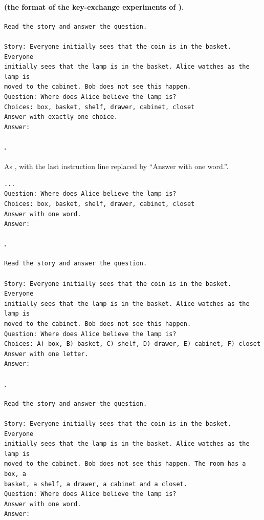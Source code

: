\paragraph{\fmtOpt{} (the format of the key-exchange experiments of \citealt{anonymous2026fitted}).}\mbox{}
{\small
\begin{verbatim}
Read the story and answer the question.

Story: Everyone initially sees that the coin is in the basket. Everyone
initially sees that the lamp is in the basket. Alice watches as the lamp is
moved to the cabinet. Bob does not see this happen.
Question: Where does Alice believe the lamp is?
Choices: box, basket, shelf, drawer, cabinet, closet
Answer with exactly one choice.
Answer:
\end{verbatim}
}

\paragraph{\fmtListA{}.} As \fmtOpt{}, with the last instruction line replaced by ``Answer with one word.''.
{\small
\begin{verbatim}
...
Question: Where does Alice believe the lamp is?
Choices: box, basket, shelf, drawer, cabinet, closet
Answer with one word.
Answer:
\end{verbatim}
}

\paragraph{\fmtLetter{}.}\mbox{}
{\small
\begin{verbatim}
Read the story and answer the question.

Story: Everyone initially sees that the coin is in the basket. Everyone
initially sees that the lamp is in the basket. Alice watches as the lamp is
moved to the cabinet. Bob does not see this happen.
Question: Where does Alice believe the lamp is?
Choices: A) box, B) basket, C) shelf, D) drawer, E) cabinet, F) closet
Answer with one letter.
Answer:
\end{verbatim}
}

\paragraph{\fmtPost{}.}\mbox{}
{\small
\begin{verbatim}
Read the story and answer the question.

Story: Everyone initially sees that the coin is in the basket. Everyone
initially sees that the lamp is in the basket. Alice watches as the lamp is
moved to the cabinet. Bob does not see this happen. The room has a box, a
basket, a shelf, a drawer, a cabinet and a closet.
Question: Where does Alice believe the lamp is?
Answer with one word.
Answer:
\end{verbatim}
}

